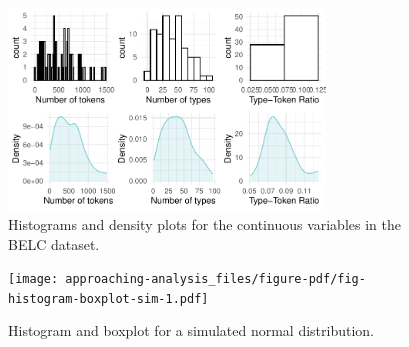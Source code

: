 \documentclass[
  letterpaper,
]{latex/krantz}
\begin{document}
\begin{figure}[h]

{\centering \includegraphics[width=0.75\textwidth,height=\textheight]{approaching-analysis_files/figure-pdf/fig-summaries-histograms-belc-1.pdf}

}

\caption{\label{fig-summaries-histograms-belc}Histograms and density
plots for the continuous variables in the BELC dataset.}

\end{figure}

\begin{figure}[h]

{\centering \texttt{[image: approaching-analysis\_files/figure-pdf/fig-histogram-boxplot-sim-1.pdf]}

}

\caption{\label{fig-histogram-boxplot-sim}Histogram and boxplot for a
simulated normal distribution.}

\end{figure}
\end{document}
